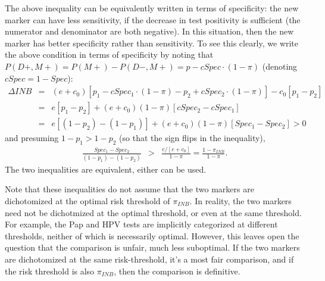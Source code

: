 \documentclass[11pt]{article}
\begin{document}
The above inequality can be equivalently written in terms of specificity: the new marker can have less sensitivity, if the decrease in test positivity is sufficient (the numerator and denominator are both negative).  In this situation, then the new marker has better specificity rather than sensitivity.  To see this clearly, we write the above condition in terms of specificity by noting that $P(D+,M+)=P(M+)-P(D-,M+)=p-cSpec\cdot(1-\pi)$ (denoting $cSpec=1-Spec$):
\begin{eqnarray*}
\Delta INB &=& (e+c_0)[p_1-cSpec_1\cdot(1-\pi) - p_2+cSpec_2\cdot(1-\pi)] - c_0[p_1-p_2]\\
           &=& e[p_1-p_2] +  (e+c_0)(1-\pi)[cSpec_2-cSpec_1]\\
           &=& e[(1-p_2)-(1-p_1)] + (e+c_0)(1-\pi)[Spec_1-Spec_2] >0
\end{eqnarray*}
and presuming $1-p_1>1-p_2$ (so that the sign flips in the inequality),
\begin{eqnarray*}
\frac{Spec_1-Spec_2}{(1-p_1)-(1-p_2)} &>& \frac{e/[e+c_0]}{1-\pi} = \frac{1-\pi_{INB}}{1-\pi}.
\end{eqnarray*}
The two inequalities are equivalent, either can be used.  


Note that these inequalities do not assume that the two markers are dichotomized at the optimal risk threshold of $\pi_{INB}$. In reality, the two markers need not be dichotmized at the optimal threshold, or even at the same threshold.  For example, the Pap and HPV tests are implicitly categorized at different thresholds, neither of which is necessarily optimal.  However, this leaves open the question that the comparison is unfair, much less suboptimal.  If the two markers are dichotomized at the same risk-threshold, it's a most fair comparison, and if the risk threshold is also $\pi_{INB}$, then the comparison is definitive.
\end{document}
